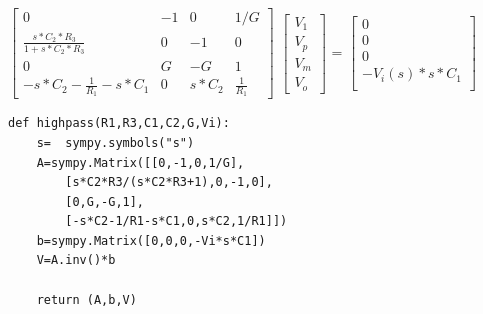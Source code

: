 \documentclass{article}
\begin{document}
$\begin{bmatrix}
    0   & -1 & 0  & 1/G \\
    \frac{s*C_2*R_3}{1+s*C_2*R_3}  & 0 & -1 & 0\\
    0  & G & -G & 1 \\
    -s*C_2 - \frac{1}{R_1} - s*C_1 & 0 & s*C_2 & \frac{1}{R_1}
\end{bmatrix}$
$\begin{bmatrix}
    V_1\\
    V_p\\
    V_m \\
    V_o
\end{bmatrix}$
=
$\begin{bmatrix}
    0 \\
    0 \\
    0 \\
    -V_i(s)*s*C_1 \\
    
\end{bmatrix}$
\newline
\newline
\begin{lstlisting}
def highpass(R1,R3,C1,C2,G,Vi):
    s=  sympy.symbols("s")
    A=sympy.Matrix([[0,-1,0,1/G],
        [s*C2*R3/(s*C2*R3+1),0,-1,0],
        [0,G,-G,1],
        [-s*C2-1/R1-s*C1,0,s*C2,1/R1]])
    b=sympy.Matrix([0,0,0,-Vi*s*C1])
    V=A.inv()*b

    return (A,b,V)
\end{lstlisting}
\end{document}
